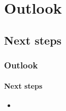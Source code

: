 \section{Outlook}

\subsection{Next steps}

\begin{frame}
\frametitle{Outlook}
\framesubtitle{Next steps }
\begin{itemize}
  \item
\end{itemize}
\end{frame}